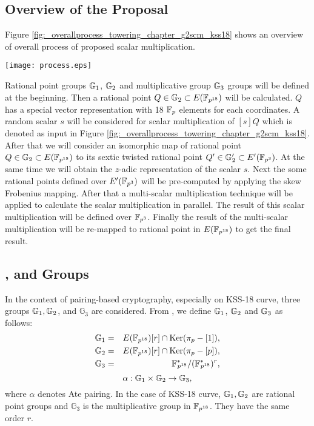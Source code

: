 \subsection{Overview of the Proposal} 
Figure \ref{fig:_overallprocess_towering_chapter_g2scm_kss18} shows an overview of overall process of proposed scalar multiplication.
\begin{figure*}[ht]
\centering
	\texttt{[image: process.eps]}
\caption{Overview of the proposed scalar multiplication for KSS-18 curve.}
\label{fig:_overallprocess_towering_chapter_g2scm_kss18}
\end{figure*}
Rational point groups ${\mathbb{G}}_{1}$, ${\mathbb{G}}_{2}$ and multiplicative group ${\mathbb{G}}_{3}$ groups will be defined at the beginning. Then a rational point $Q\in {\mathbb{G}}_{2} \subset E({\mathbb{F}}_{p^{18}})$ will be calculated.
$Q$ has a  special vector representation with 18 ${\mathbb{F}}_{p}$ elements for each coordinates. 
A random scalar $s$ will be considered for scalar multiplication of $[s]Q$ which is denoted as input in  Figure \ref{fig:_overallprocess_towering_chapter_g2scm_kss18}. After that we will consider an isomorphic map of rational point $Q\in {\mathbb{G}}_{2} \subset E({\mathbb{F}}_{p^{18}})$ to its sextic twisted rational point $Q' \in {\mathbb{G}}_{2}' \subset E'({\mathbb{F}}_{p^{3}})$. At the same time we will obtain the $z$-adic  representation of the scalar $s$. Next the some rational points defined over $E'(\mathbb{F}_{p^3})$ will be pre-computed by applying the skew Frobenius mapping. After that a multi-scalar multiplication technique will be applied to calculate the scalar multiplication in parallel. The result of this scalar multiplication will be defined over $\mathbb{F}_{p^3}$. Finally the result of the multi-scalar multiplication will be re-mapped to rational point in $E(\mathbb{F}_{p^{18}})$ to get the final result.

\subsection{,  and  Groups} 
In the context of pairing-based cryptography, especially on KSS-18 curve, three groups ${\mathbb{G}}_{1}, {\mathbb{G}}_{2}$, and $\mathbb{G}_3$ are considered. From \cite{PAIRING:MANS13}, we define ${\mathbb{G}}_{1}$, ${\mathbb{G}}_{2}$ and ${\mathbb{G}}_{3}$ as follows:
\begin{eqnarray}\label{eq:g1_chapter_g2scm_kss18}
{\mathbb{G}}_{1} & = &  E({\mathbb{F}}_{p^{18}}) [r] \cap \text{Ker}(\pi_p - [1]), \nonumber \\
{\mathbb{G}}_{2} & = &  E({\mathbb{F}}_{p^{18}}) [r] \cap \text{Ker}(\pi_p - [p]), \nonumber \\
{\mathbb{G}}_{3} & = & {{\mathbb{F}}^{\ast}}_{\!\!\!p^{18}}/({{\mathbb{F}}^{\ast}}_{\!\!\!p^{18}})^r, \nonumber
\end{eqnarray}
\begin{equation}
\alpha : {\mathbb{G}}_{1} \times {\mathbb{G}}_{2} \rightarrow {\mathbb{G}}_{3},
\end{equation}
where $\alpha$ denotes Ate pairing. In the case of KSS-18 curve, ${\mathbb{G}}_{1}, {\mathbb{G}}_{2}$ are rational point groups and $\mathbb{G}_3$ is the multiplicative group in $\mathbb{F}_{p^{18}}$. They have the same order $r$. 

